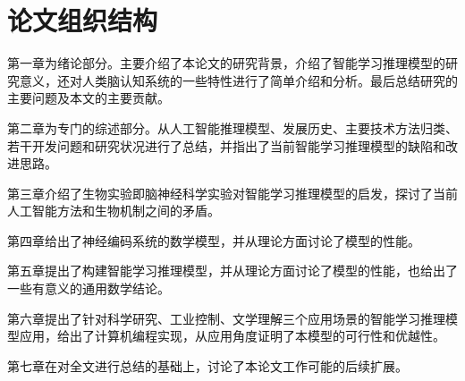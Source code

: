 \section{论文组织结构}
第一章为绪论部分。主要介绍了本论文的研究背景，介绍了智能学习推理模型的研究意义，还对人类脑认知系统的一些特性进行了简单介绍和分析。最后总结研究的主要问题及本文的主要贡献。 

第二章为专门的综述部分。从人工智能推理模型、发展历史、主要技术方法归类、若干开发问题和研究状况进行了总结，并指出了当前智能学习推理模型的缺陷和改进思路。

第三章介绍了生物实验即脑神经科学实验对智能学习推理模型的启发，探讨了当前人工智能方法和生物机制之间的矛盾。

第四章给出了神经编码系统的数学模型，并从理论方面讨论了模型的性能。

第五章提出了构建智能学习推理模型，并从理论方面讨论了模型的性能，也给出了一些有意义的通用数学结论。

第六章提出了针对科学研究、工业控制、文学理解三个应用场景的智能学习推理模型应用，给出了计算机编程实现，从应用角度证明了本模型的可行性和优越性。

第七章在对全文进行总结的基础上，讨论了本论文工作可能的后续扩展。